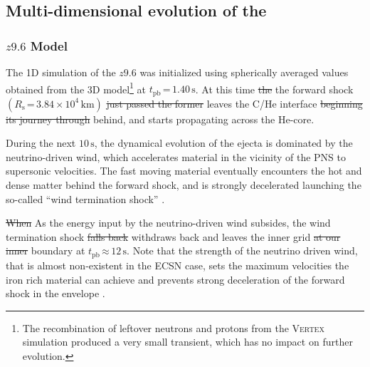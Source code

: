 \documentclass[fleqn,usenatbib]{mnras}
\newcommand{\tpb}{\ensuremath{t_{\text{pb}}}}
\newcommand{\km}{\ensuremath{\mathrm{km}}}
\newcommand{\s}{\ensuremath{\text{s}}}
\newcommand{\vertex}{\textsc{Vertex}\xspace}
\newcommand{\NY}[2]{{\color{blue}\sout{#1}#2}}
\begin{document}
\iffalse

\subsection{Multi-dimensional evolution of the }
\subsubsection{$z9.6$ Model}
\label{sec:Long term evolution of the z9.6 model}
The 1D simulation of the $z9.6$ was initialized using spherically averaged values obtained from the 3D model\footnote{The recombination of leftover neutrons and protons from the \vertex simulation produced a very small transient, which has no impact on further evolution.} at $\tpb\,\mathord{=}\,1.40\,\s$. At this time \NY{the}{} the forward shock $(R_{\text{s}}\,\mathord{=}\,3.84\times 10^4\, \km)$ \NY{just passed the former}{ leaves the} C/He interface \NY{beginning its journey through}{ behind, and starts propagating across} the He-core.

During the next $10\, \s$, the dynamical evolution of the ejecta is dominated by the neutrino-driven wind, which accelerates material in the vicinity of the PNS to supersonic velocities. The fast \NY{}{moving} material eventually encounters the hot and dense matter behind the forward shock, and is strongly decelerated launching the so-called ``wind termination shock'' \citep{Wanajo2002,Arcones2007}. 

\NY{When}{ As} the energy input by the neutrino-driven wind subsides, the wind termination shock \NY{falls back}{ withdraws back} and leaves the \NY{}{inner} grid \NY{at our inner}{} boundary at $\tpb\,\mathord{\approx}\,12\,\s$.
Note that the strength of the neutrino driven wind, that is almost non-existent in the ECSN case, sets the maximum velocities the iron rich material can achieve and prevents strong deceleration of the forward shock in the envelope \citep{Wongwathanarat2015}. 
\end{document}
